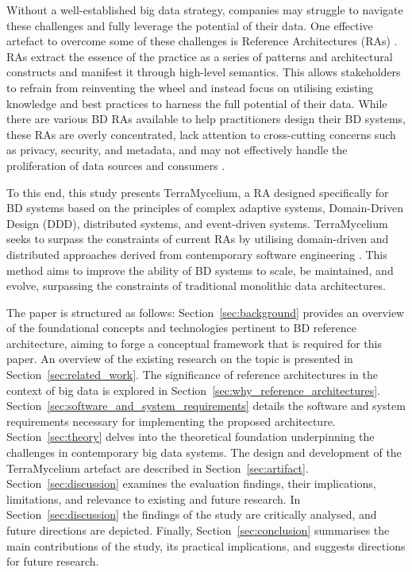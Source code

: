 \documentclass[review]{elsarticle}
\begin{document}
Without a well-established big data strategy, companies may struggle to navigate these challenges and fully leverage the potential of their data. One effective artefact to overcome some of these challenges is Reference Architectures (RAs) \cite{Cloutier2010}. RAs extract the essence of the practice as a series of patterns and architectural constructs and manifest it through high-level semantics. This allows stakeholders to refrain from reinventing the wheel and instead focus on utilising existing knowledge and best practices to harness the full potential of their data. While there are various BD RAs available to help practitioners design their BD systems, these RAs are overly concentrated, lack attention to cross-cutting concerns such as privacy, security, and metadata, and may not effectively handle the proliferation of data sources and consumers \cite{ataei2022state,AtaeiACIS}.

To this end, this study presents TerraMycelium, a RA designed specifically for BD systems based on the principles of complex adaptive systems, Domain-Driven Design (DDD), distributed systems, and event-driven systems. TerraMycelium seeks to surpass the constraints of current RAs by utilising domain-driven and distributed approaches derived from contemporary software engineering \cite{ataei2023application}. This method aims to improve the ability of BD systems to scale, be maintained, and evolve, surpassing the constraints of traditional monolithic data architectures.

The paper is structured as follows: Section~\ref{sec:background} provides an overview of the foundational concepts and technologies pertinent to BD reference architecture, aiming to forge a conceptual framework that is required for this paper. An overview of the existing research on the topic is presented in Section~\ref{sec:related_work}. The significance of reference architectures in the context of big data is explored in Section~\ref{sec:why_reference_architectures}. Section~\ref{sec:software_and_system_requirements} details the software and system requirements necessary for implementing the proposed architecture. Section~\ref{sec:theory} delves into the theoretical foundation underpinning the challenges in contemporary big data systems. The design and development of the TerraMycelium artefact are described in Section~\ref{sec:artifact}. Section~\ref{sec:discussion} examines the evaluation findings, their implications, limitations, and relevance to existing and future research. In Section~\ref{sec:discussion} the findings of the study are critically analysed, and future directions are depicted. Finally, Section~\ref{sec:conclusion} summarises the main contributions of the study, its practical implications, and suggests directions for future research.
\end{document}
